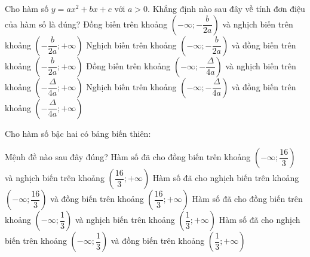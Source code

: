 \begin{ex}%
	Cho hàm số $y=ax^2+bx+c$ với $a>0$. Khẳng định nào sau đây về tính đơn điệu của hàm số là đúng?
	\choice
	{Đồng biến trên khoảng $\left(-\infty; -\dfrac{b}{2a}\right)$ và nghịch biến trên khoảng $\left(-\dfrac{b}{2a}; +\infty\right)$}
	{\True Nghịch biến trên khoảng $\left(-\infty; -\dfrac{b}{2a}\right)$ và đồng biến trên khoảng $\left(-\dfrac{b}{2a}; +\infty\right)$}
	{Đồng biến trên khoảng $\left(-\infty; -\dfrac{\Delta}{4a}\right)$ và nghịch biến trên khoảng $\left(-\dfrac{\Delta}{4a}; +\infty\right)$}
	{Nghịch biến trên khoảng $\left(-\infty; -\dfrac{\Delta}{4a}\right)$ và đồng biến trên khoảng $\left(-\dfrac{\Delta}{4a}; +\infty\right)$}
\end{ex}

\begin{ex}%
	Cho hàm số bậc hai có bảng biến thiên:\\
	\begin{center}
	\end{center}
	Mệnh đề nào sau đây đúng?
	\choice
	{Hàm số đã cho đồng biến trên khoảng $\left(-\infty; \dfrac{16}{3}\right)$ và nghịch biến trên khoảng $\left(\dfrac{16}{3}; +\infty\right)$}
	{Hàm số đã cho nghịch biến trên khoảng $\left(-\infty; \dfrac{16}{3}\right)$ và đồng biến trên khoảng $\left(\dfrac{16}{3}; +\infty\right)$}
	{\True Hàm số đã cho đồng biến trên khoảng $\left(-\infty; \dfrac{1}{3}\right)$ và nghịch biến trên khoảng $\left(\dfrac{1}{3}; +\infty\right)$}
	{Hàm số đã cho nghịch biến trên khoảng $\left(-\infty; \dfrac{1}{3}\right)$ và đồng biến trên khoảng $\left(\dfrac{1}{3}; +\infty\right)$}
\end{ex}

